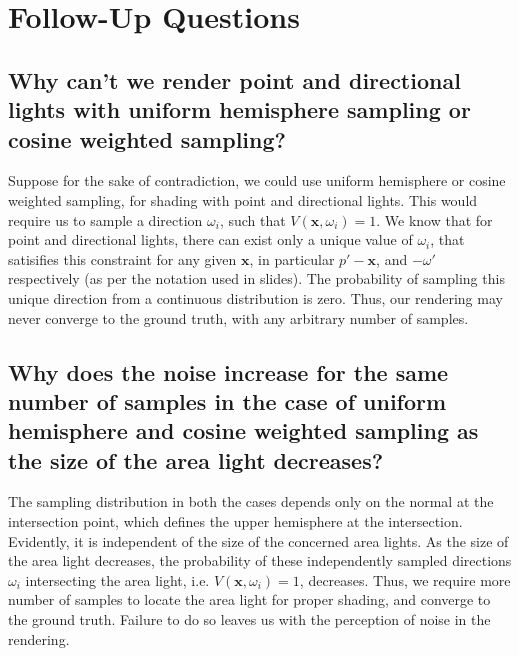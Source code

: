 \documentclass[a4paper]{article}
\begin{document}
\section{Follow-Up Questions}

\subsection{Why can't we render point and directional lights with uniform hemisphere sampling or cosine weighted sampling?}

Suppose for the sake of contradiction, we could use uniform hemisphere or cosine weighted sampling, for shading with point and directional lights. This would require us to sample a direction $\omega_i$, such that $V(\textbf{x}, \omega_i) = 1$. We know that for point and directional lights, there can exist only a unique value of $\omega_i$, that satisifies this constraint for any given $\textbf{x}$, in particular $p' - \textbf{x}$, and $-\omega'$ respectively (as per the notation used in slides). The probability of sampling this unique direction from a continuous distribution is zero. Thus, our rendering may never converge to the ground truth, with any arbitrary number of samples.

\subsection{Why does the noise increase for the same number of samples in the case of uniform hemisphere and cosine weighted sampling as the size of the area light decreases?}

The sampling distribution in both the cases depends only on the normal at the intersection point, which defines the upper hemisphere at the intersection. Evidently, it is independent of the size of the concerned area lights. As the size of the area light decreases, the probability of these independently sampled directions $\omega_i$ intersecting the area light, i.e. $V(\textbf{x}, \omega_i) = 1$, decreases. Thus, we require more number of samples to locate the area light for proper shading, and converge to the ground truth. Failure to do so leaves us with the perception of noise in the rendering.
\end{document}
